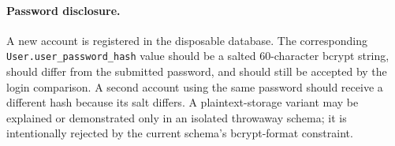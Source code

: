 \paragraph{Password disclosure.} A new account is registered in the disposable database. The corresponding \verb|User.user_password_hash| value should be a salted 60-character bcrypt string, should differ from the submitted password, and should still be accepted by the login comparison. A second account using the same password should receive a different hash because its salt differs. A plaintext-storage variant may be explained or demonstrated only in an isolated throwaway schema; it is intentionally rejected by the current schema's bcrypt-format constraint.
